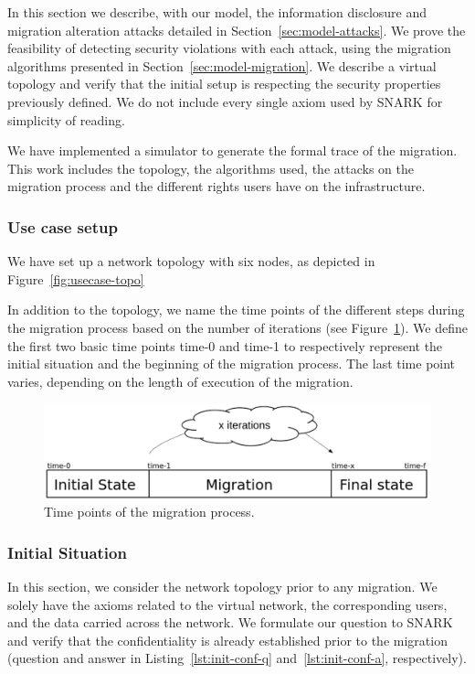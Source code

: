 \label{sec:model-usecase}
In this section we describe, with our model, the information disclosure and migration alteration attacks detailed in Section~\ref{sec:model-attacks}.
We prove the feasibility of detecting security violations with each attack, using the migration algorithms presented in Section~\ref{sec:model-migration}.
We describe a virtual topology and verify that the initial setup is respecting the security properties previously defined.
We do not include every single axiom used by SNARK for simplicity of reading.

We have implemented a simulator to generate the formal trace of the migration.
This work includes the topology, the algorithms used, the attacks on the migration process and the different rights users have on the infrastructure.

\subsubsection{Use case setup}
We have set up a network topology with six nodes, as depicted in Figure~\ref{fig:usecase-topo}




In addition to the topology, we name the time points of the different steps during the migration process based on the number of iterations (see Figure~\ref{fig:time-points}).
We define the first two basic time points time-0 and time-1 to respectively represent the initial situation and the beginning of the migration process. The last time point varies, depending on the length of execution of the migration.


\begin{figure}[htbp]
\centering
\includegraphics[scale=0.5]{figures/time-points-evolution} 
\caption{Time points of the migration process.\label{fig:time-points}}
\end{figure}

\subsubsection{Initial Situation}
In this section, we consider the network topology prior to any migration.
We solely have the axioms related to the virtual network, the corresponding users, and the data carried across the network.
We formulate our question to SNARK and verify that the confidentiality is already established prior to the migration (question and answer in Listing~\ref{lst:init-conf-q} and~\ref{lst:init-conf-a}, respectively).



